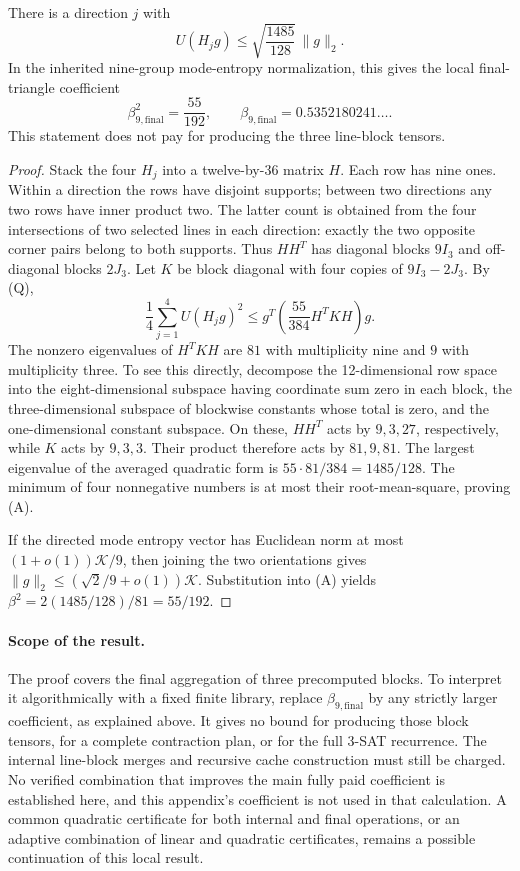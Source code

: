 \begin{theorem}
There is a direction $j$ with
\[
 U(H_jg)\le\sqrt{\frac{1485}{128}}\,\|g\|_2.
\tag{A}
\]
In the inherited nine-group mode-entropy normalization, this gives the
local final-triangle coefficient
\[
 \beta_{9,\mathrm{final}}^2=\frac{55}{192},\qquad
 \beta_{9,\mathrm{final}}=0.5352180241\ldots.
\]
This statement does not pay for producing the three line-block tensors.
\end{theorem}
\begin{proof}
Stack the four $H_j$ into a twelve-by-36 matrix $H$. Each row has nine
ones. Within a direction the rows have disjoint supports; between two
directions any two rows have inner product two. The latter count is
obtained from the four intersections of two selected lines in each
direction: exactly the two opposite corner pairs belong to both supports.
Thus $HH^T$ has diagonal blocks $9I_3$ and off-diagonal blocks $2J_3$.
Let $K$ be block diagonal with four copies of $9I_3-2J_3$.
By (Q),
\[
 \frac14\sum_{j=1}^4 U(H_jg)^2
 \le g^T\left(\frac{55}{384}H^TKH\right)g.
\]
The nonzero eigenvalues of $H^TKH$ are $81$ with multiplicity nine and
$9$ with multiplicity three. To see this directly, decompose the
12-dimensional row space into the eight-dimensional subspace having
coordinate sum zero in each block, the three-dimensional subspace of
blockwise constants whose total is zero, and the one-dimensional constant
subspace. On these, $HH^T$ acts by $9,3,27$, respectively, while $K$
acts by $9,3,3$. Their product therefore acts by $81,9,81$.
The largest eigenvalue of the averaged quadratic form is
$55\cdot81/384=1485/128$. The minimum of four nonnegative numbers is at
most their root-mean-square, proving (A).

If the directed mode entropy vector has Euclidean norm at most
$(1+o(1))\mathcal K/9$, then joining the two orientations gives
$\|g\|_2\le(\sqrt2/9+o(1))\mathcal K$. Substitution into (A) yields
$\beta^2=2(1485/128)/81=55/192$.
\end{proof}

\paragraph{Scope of the result.}
The proof covers the final aggregation of three precomputed blocks. To
interpret it algorithmically with a fixed finite library, replace
$\beta_{9,\mathrm{final}}$ by any strictly larger coefficient, as explained
above. It gives no bound for producing those block tensors, for a complete
contraction plan, or for the full 3-SAT recurrence. The internal line-block
merges and recursive cache construction must still be charged. No verified
combination that improves the main fully paid coefficient is established
here, and this appendix's coefficient is not used in that calculation.
A common quadratic certificate for both internal and final operations,
or an adaptive combination of linear and quadratic certificates, remains
a possible continuation of this local result.
